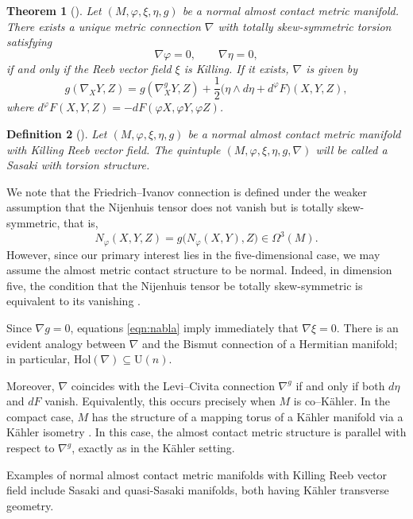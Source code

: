 \documentclass{article}
\newtheorem{thm}{Theorem}[section]
\newtheorem{defn}[thm]{Definition}
\theoremstyle{definition}
\renewcommand{\phi}{\varphi}
\numberwithin{equation}{section}
\begin{document}
\begin{thm}[\cite{FI,FI2}] \label{thm:nabla}
Let \((M,\phi,\xi,\eta,g)\) be a normal almost contact metric manifold.  
There exists a unique metric connection \(\nabla\) with totally skew-symmetric torsion satisfying 
\begin{equation} \label{eqn:nabla}
    \nabla \phi = 0, \qquad \nabla \eta = 0,
\end{equation}
if and only if the Reeb vector field \(\xi\) is Killing.  
If it exists, \(\nabla\) is given by
\begin{equation} \label{eqn:nabla2}
    g(\nabla_X Y, Z) 
    = g(\nabla^g_X Y, Z) 
      + \frac{1}{2} \bigl(\eta \wedge d\eta + d^\phi F \bigr)(X,Y,Z),
\end{equation}
where \(d^\phi F(X,Y,Z) = -dF(\phi X, \phi Y, \phi Z)\).
\end{thm}
\begin{defn} [\cite{CoMa}]
 Let \((M,\phi,\xi,\eta, g)\) be a normal almost contact metric manifold with Killing Reeb vector field. The quintuple \((M,\phi,\xi, \eta, g, \nabla)\) will be called a \emph{Sasaki with torsion structure}.    
\end{defn}
We note that the Friedrich--Ivanov connection is defined under the weaker assumption that the Nijenhuis tensor does not vanish but is totally skew-symmetric, that is,
\[
N_\phi(X,Y,Z) = g\bigl(N_\phi(X,Y),Z\bigr) \in \Omega^3(M).
\]
However, since our primary interest lies in the five-dimensional case, we may assume the almost metric contact structure to be normal. Indeed, in dimension five, the condition that the Nijenhuis tensor be totally skew-symmetric is equivalent to its vanishing \cite{CM}.\par
Since \(\nabla g = 0\), equations \eqref{eqn:nabla} imply immediately that \(\nabla \xi = 0\).
There is an evident analogy between \(\nabla\) and the Bismut connection of a Hermitian manifold; in particular, $
\mathrm{Hol}(\nabla) \subseteq \mathrm{U}(n).$

Moreover, \(\nabla\) coincides with the Levi--Civita connection \(\nabla^g\) if and only if both \(d\eta\) and \(dF\) vanish.
Equivalently, this occurs precisely when \(M\) is co--Kähler. In the compact case, $M$ has the structure of a mapping torus of a Kähler manifold via a Kähler isometry \cite{Li}.
In this case, the almost contact metric structure is parallel with respect to \(\nabla^g\), exactly as in the Kähler setting.

\medskip

Examples of normal almost contact metric manifolds with Killing Reeb vector field include Sasaki and quasi-Sasaki manifolds, both having Kähler transverse geometry.
\end{document}
